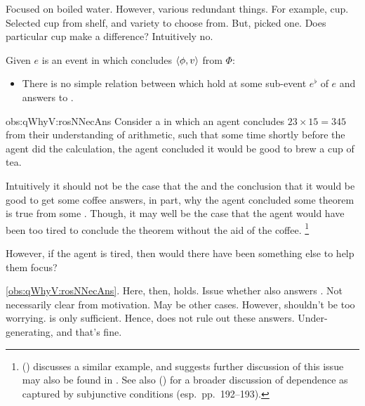 \begin{note}
  Focused on boiled water.
  However, various redundant things.
  For example, cup.
  Selected cup from shelf, and variety to choose from.
  But, picked one.
  Does particular cup make a difference?
  Intuitively no.

  \begin{observation}
    \label{obs:qWhyV:rosNNecAns}
    \medskip

    Given \(e\) is an event in which \vAgent{} concludes \(\langle \phi, v \rangle\) from \(\Phi\):
    \begin{itemize}
    \item
      There is no simple relation between  which hold at some sub-event \(e^{\flat}\) of \(e\) and answers to \qWhyV{}.
    \end{itemize}
    \vspace{-\baselineskip}
  \end{observation}

  \begin{motivation}{obs:qWhyV:rosNNecAns}
    Consider a  in which an agent concludes \(23 \times 15 = 345\) from their understanding of arithmetic, such that some time shortly before the agent did the calculation, the agent concluded it would be good to brew a cup of tea.

    Intuitively it should not be the case that the \ros{} and the conclusion that it would be good to get some coffee answers, in part, why the agent concluded some theorem is true from some \pool{}.
    Though, it may well be the case that the agent would have been too tired to conclude the theorem without the aid of the coffee.%
    \footnote{
      \citeauthor{Armstrong:1968vh} (\citeyear[195--196]{Armstrong:1968vh}) discusses a similar example, and suggests further discussion of this issue may also be found in \textcite{Moore:1962up}.
      See also \citeauthor{Sanford:1989aa} (\citeyear{Sanford:1989aa}) for a broader discussion of dependence as captured by subjunctive conditions (esp.\ pp.\ 192--193).
    }

    However, if the agent is tired, then would there have been something else to help them focus?
  \end{motivation}

  \autoref{obs:qWhyV:rosNNecAns}.
  Here, then, \ros{} holds.
  Issue whether \ros{} also answers \qWhy{}.
  Not necessarily clear from motivation.
  May be other cases.
  However, shouldn't be too worrying.
  \qWhyV{} is only sufficient.
  Hence, does not rule out these answers.
  Under-generating, and that's fine.
\end{note}

